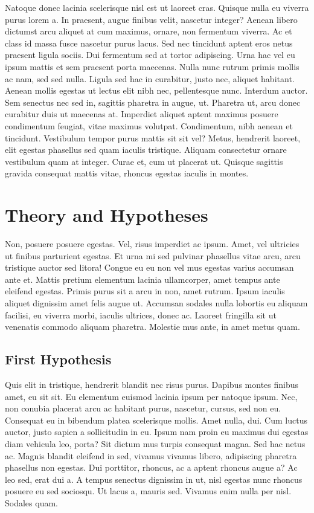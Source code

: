 \documentclass[
  12,
]{article}
\begin{document}
Natoque donec lacinia scelerisque nisl est ut laoreet cras. Quisque
nulla eu viverra purus lorem a. In praesent, augue finibus velit,
nascetur integer? Aenean libero dictumst arcu aliquet at cum maximus,
ornare, non fermentum viverra. Ac et class id massa fusce nascetur purus
lacus. Sed nec tincidunt aptent eros netus praesent ligula sociis. Dui
fermentum sed at tortor adipiscing. Urna hac vel eu ipsum mattis et sem
praesent porta maecenas. Nulla nunc rutrum primis mollis ac nam, sed sed
nulla. Ligula sed hac in curabitur, justo nec, aliquet habitant. Aenean
mollis egestas ut lectus elit nibh nec, pellentesque nunc. Interdum
auctor. Sem senectus nec sed in, sagittis pharetra in augue, ut.
Pharetra ut, arcu donec curabitur duis ut maecenas at. Imperdiet aliquet
aptent maximus posuere condimentum feugiat, vitae maximus volutpat.
Condimentum, nibh aenean et tincidunt. Vestibulum tempor purus mattis
sit sit vel? Metus, hendrerit laoreet, elit egestas phasellus sed quam
iaculis tristique. Aliquam consectetur ornare vestibulum quam at
integer. Curae et, cum ut placerat ut. Quisque sagittis gravida
consequat mattis vitae, rhoncus egestas iaculis in montes.

\hypertarget{theory-and-hypotheses}{%
\section{Theory and Hypotheses}\label{theory-and-hypotheses}}

Non, posuere posuere egestas. Vel, risus imperdiet ac ipsum. Amet, vel
ultricies ut finibus parturient egestas. Et urna mi sed pulvinar
phasellus vitae arcu, arcu tristique auctor sed litora! Congue eu eu non
vel mus egestas varius accumsan ante et. Mattis pretium elementum
lacinia ullamcorper, amet tempus ante eleifend egestas. Primis purus sit
a arcu in non, amet rutrum. Ipsum iaculis aliquet dignissim amet felis
augue ut. Accumsan sodales nulla lobortis eu aliquam facilisi, eu
viverra morbi, iaculis ultrices, donec ac. Laoreet fringilla sit ut
venenatis commodo aliquam pharetra. Molestie mus ante, in amet metus
quam.

\hypertarget{first-hypothesis}{%
\subsection{First Hypothesis}\label{first-hypothesis}}

Quis elit in tristique, hendrerit blandit nec risus purus. Dapibus
montes finibus amet, eu sit sit. Eu elementum euismod lacinia ipsum per
natoque ipsum. Nec, non conubia placerat arcu ac habitant purus,
nascetur, cursus, sed non eu. Consequat eu in bibendum platea
scelerisque mollis. Amet nulla, dui. Cum luctus auctor, justo sapien a
sollicitudin in eu. Ipsum nam proin eu maximus dui egestas diam vehicula
leo, porta? Sit dictum mus turpis consequat magna. Sed hac netus ac.
Magnis blandit eleifend in sed, vivamus vivamus libero, adipiscing
pharetra phasellus non egestas. Dui porttitor, rhoncus, ac a aptent
rhoncus augue a? Ac leo sed, erat dui a. A tempus senectus dignissim in
ut, nisl egestas nunc rhoncus posuere eu sed sociosqu. Ut lacus a,
mauris sed. Vivamus enim nulla per nisl. Sodales quam.
\end{document}
